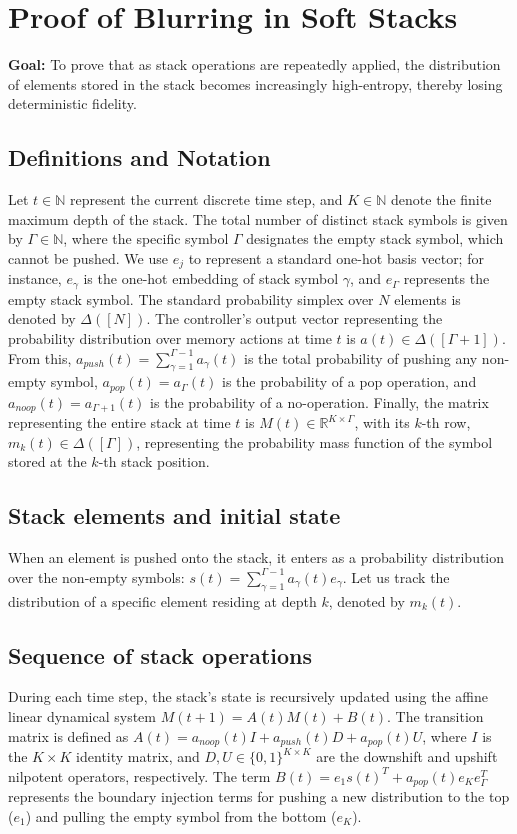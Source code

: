 \documentclass{article}
\begin{document}
\section{Proof of Blurring in Soft Stacks}

\textbf{Goal:} To prove that as stack operations are repeatedly applied, the distribution of elements stored in the stack becomes increasingly high-entropy, thereby losing deterministic fidelity.

\subsection*{Definitions and Notation}
Let $t \in \mathbb{N}$ represent the current discrete time step, and $K \in \mathbb{N}$ denote the finite maximum depth of the stack. The total number of distinct stack symbols is given by $\Gamma \in \mathbb{N}$, where the specific symbol $\Gamma$ designates the empty stack symbol, which cannot be pushed. We use $e_j$ to represent a standard one-hot basis vector; for instance, $e_\gamma$ is the one-hot embedding of stack symbol $\gamma$, and $e_\Gamma$ represents the empty stack symbol. The standard probability simplex over $N$ elements is denoted by $\Delta([N])$. The controller's output vector representing the probability distribution over memory actions at time $t$ is $a(t) \in \Delta([\Gamma+1])$. From this, $a_{push}(t) = \sum_{\gamma=1}^{\Gamma-1} a_\gamma(t)$ is the total probability of pushing any non-empty symbol, $a_{pop}(t) = a_\Gamma(t)$ is the probability of a pop operation, and $a_{noop}(t) = a_{\Gamma+1}(t)$ is the probability of a no-operation. Finally, the matrix representing the entire stack at time $t$ is $M(t) \in \mathbb{R}^{K \times \Gamma}$, with its $k$-th row, $m_k(t) \in \Delta([\Gamma])$, representing the probability mass function of the symbol stored at the $k$-th stack position.

\subsection{Stack elements and initial state}
When an element is pushed onto the stack, it enters as a probability distribution over the non-empty symbols: $s(t) = \sum_{\gamma=1}^{\Gamma-1} a_\gamma(t)e_\gamma$. Let us track the distribution of a specific element residing at depth $k$, denoted by $m_k(t)$.

\subsection{Sequence of stack operations}
During each time step, the stack's state is recursively updated using the affine linear dynamical system $M(t+1) = A(t)M(t) + B(t)$. The transition matrix is defined as $A(t) = a_{noop}(t)I + a_{push}(t)D + a_{pop}(t)U$, where $I$ is the $K \times K$ identity matrix, and $D, U \in \{0,1\}^{K \times K}$ are the downshift and upshift nilpotent operators, respectively. The term $B(t) = e_1s(t)^T + a_{pop}(t)e_K e_\Gamma^T$ represents the boundary injection terms for pushing a new distribution to the top ($e_1$) and pulling the empty symbol from the bottom ($e_K$).
\end{document}
